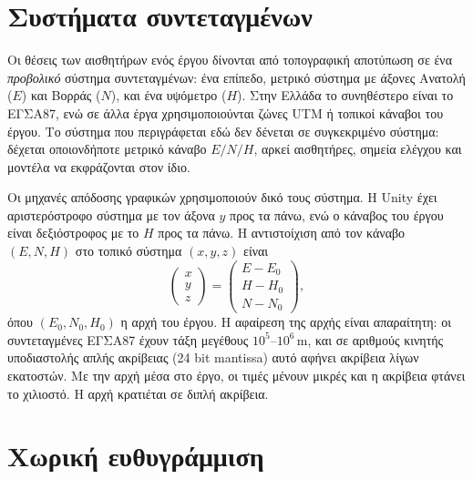 \section{Συστήματα συντεταγμένων}
\label{sec:bg-crs}

Οι θέσεις των αισθητήρων ενός έργου δίνονται από τοπογραφική αποτύπωση σε ένα \emph{προβολικό} σύστημα συντεταγμένων: ένα επίπεδο, μετρικό σύστημα με άξονες Ανατολή ($E$) και Βορράς ($N$), και ένα υψόμετρο ($H$). Στην Ελλάδα το συνηθέστερο είναι το ΕΓΣΑ87, ενώ σε άλλα έργα χρησιμοποιούνται ζώνες UTM ή τοπικοί κάναβοι του έργου. Το σύστημα που περιγράφεται εδώ δεν δένεται σε συγκεκριμένο σύστημα: δέχεται οποιονδήποτε μετρικό κάναβο $E/N/H$, αρκεί αισθητήρες, σημεία ελέγχου και μοντέλα να εκφράζονται στον ίδιο.

Οι μηχανές απόδοσης γραφικών χρησιμοποιούν δικό τους σύστημα. Η Unity έχει αριστερόστροφο σύστημα με τον άξονα $y$ προς τα πάνω, ενώ ο κάναβος του έργου είναι δεξιόστροφος με το $H$ προς τα πάνω. Η αντιστοίχιση από τον κάναβο $(E, N, H)$ στο τοπικό σύστημα $(x, y, z)$ είναι
\begin{equation}
  \begin{pmatrix} x \\ y \\ z \end{pmatrix} =
  \begin{pmatrix} E - E_0 \\ H - H_0 \\ N - N_0 \end{pmatrix},
  \label{eq:enh-to-local}
\end{equation}
όπου $(E_0, N_0, H_0)$ η αρχή του έργου. Η αφαίρεση της αρχής είναι απαραίτητη: οι συντεταγμένες ΕΓΣΑ87 έχουν τάξη μεγέθους $10^5$--$10^6$\,m, και σε αριθμούς κινητής υποδιαστολής απλής ακρίβειας (24 bit mantissa) αυτό αφήνει ακρίβεια λίγων εκατοστών. Με την αρχή μέσα στο έργο, οι τιμές μένουν μικρές και η ακρίβεια φτάνει το χιλιοστό. Η αρχή κρατιέται σε διπλή ακρίβεια.

\section{Χωρική ευθυγράμμιση}
\label{sec:bg-registration}

